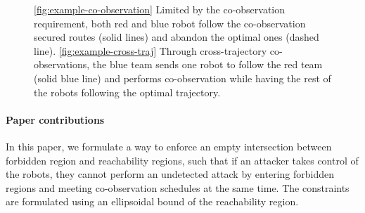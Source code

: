 \documentclass[journal]{IEEEtran}  %
\begin{document}
\begin{figure}
	\centering
    
    \caption{\ref{fig:example-co-observation} Limited by the co-observation requirement, both red and blue robot follow the co-observation secured routes (solid lines) and abandon the optimal ones (dashed line). \ref{fig:example-cross-traj} Through cross-trajectory co-observations, the blue team sends one robot to follow the red team (solid blue line) and performs co-observation while having the rest of the robots following the optimal trajectory.}\label{fig:cross-traj-comparison-set}
\end{figure}

\paragraph{Paper contributions} In this paper, we formulate a way to enforce an empty intersection between forbidden region and reachability regions, such that if an attacker takes control of the robots, they cannot perform an undetected attack by entering forbidden regions and meeting co-observation schedules at the same time. The constraints are formulated using an ellipsoidal bound of the reachability region. 
\end{document}
